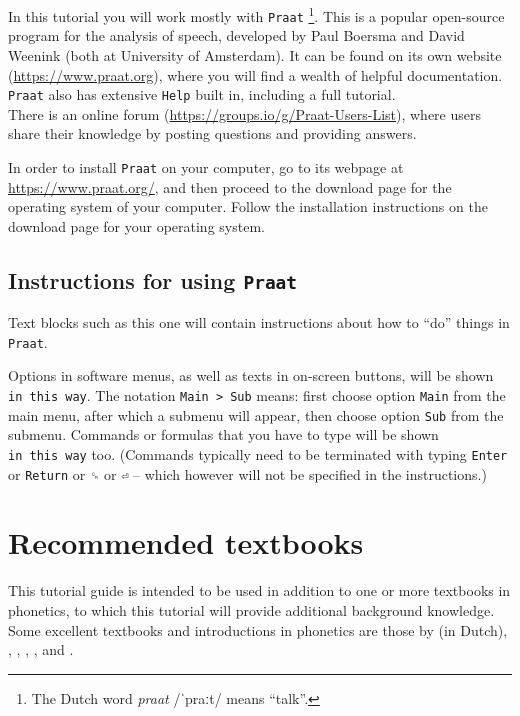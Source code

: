 \documentclass[
]{book}
\begin{document}
In this tutorial you will work mostly with \texttt{Praat} \citep{Boersma_Weenink_2024}\footnote{The Dutch word \emph{praat} /ˈpraːt/ means ``talk''.}. This is a popular open-source program for the analysis of speech, developed by Paul Boersma and David Weenink (both at University of Amsterdam). It can be found on its own website (\url{https://www.praat.org}), where you will find a wealth of helpful documentation. \texttt{Praat} also has extensive \texttt{Help} built in, including a full tutorial.\\
There is an online forum (\url{https://groups.io/g/Praat-Users-List}), where users share their knowledge by posting questions and providing answers.

In order to install \texttt{Praat} on your computer, go to its webpage at \url{https://www.praat.org/}, and then proceed to the download page for the operating system of your computer. Follow the installation instructions on the download page for your operating system.

\label{tech-layout}
\subsection*{\texorpdfstring{Instructions for using \texttt{Praat}}{Instructions for using Praat}}\label{instructions-for-using-praat}

Text blocks such as this one will contain instructions about how to ``do'' things in \texttt{Praat}.

Options in software menus, as well as texts in on-screen buttons, will be shown \texttt{in\ this\ way}.
The notation \texttt{Main\ \textgreater{}\ Sub} means: first choose option \texttt{Main} from the main menu, after which a submenu will appear, then choose option \texttt{Sub} from the submenu.
Commands or formulas that you have to type will be shown \texttt{in\ this\ way} too. (Commands typically need to be terminated with typing \texttt{Enter} or \texttt{Return} or \texttt{␍} or \texttt{⏎} -- which however will not be specified in the instructions.)

\section{Recommended textbooks}\label{sec:textbooks}

This tutorial guide is intended to be used in addition to one or more textbooks in phonetics, to which this tutorial will provide additional background knowledge.
Some excellent textbooks and introductions in phonetics are those by
\citet{Rietveld_VanHeuven_2009} (in Dutch),
\citet{Johnson_2012},
\citet{Ladefoged_Johnson_2015},
\citet{Reetz_Jongman_2020},
\citet{Beňuš_2021}, and
\citet{Zsiga_2024}.
\end{document}
